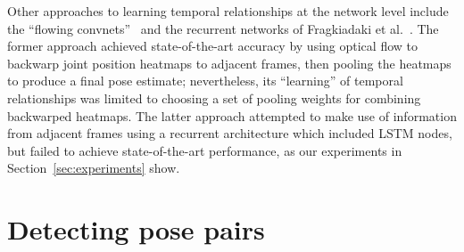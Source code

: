 \documentclass[runningheads]{llncs}
\begin{document}
Other approaches to learning temporal relationships at the network level include
the ``flowing convnets''~\cite{pfister2015flowing} and the recurrent networks of
Fragkiadaki et al.~\cite{fragkiadaki2015recurrent}. The former approach achieved
state-of-the-art accuracy by using optical flow to backwarp joint position
heatmaps to adjacent frames, then pooling the heatmaps to produce a final pose
estimate; nevertheless, its ``learning'' of temporal relationships was limited
to choosing a set of pooling weights for combining backwarped heatmaps. The
latter approach attempted to make use of information from adjacent frames using
a recurrent architecture which included LSTM nodes, but failed to achieve
state-of-the-art performance, as our experiments in
Section~\ref{sec:experiments} show.

\section{Detecting pose pairs}

\end{document}
